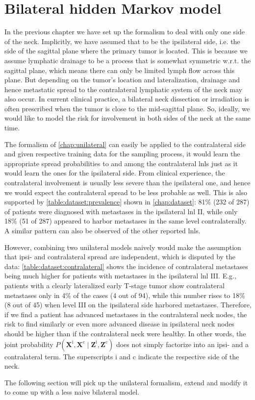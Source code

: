 \documentclass[\relativeRoot/main.tex]{subfiles}
\begin{document}
\chapter{Bilateral hidden Markov model}
\label{chap:bilateral}

In the previous chapter we have set up the formalism to deal with only one side of the neck. Implicitly, we have assumed that to be the ipsilateral side, i.e. the side of the sagittal plane where the primary tumor is located. This is because we assume lymphatic drainage to be a process that is somewhat symmetric w.r.t. the sagittal plane, which means there can only be limited lymph flow across this plane. But depending on the tumor's location and lateralization, drainage and hence metastatic spread to the contralateral lymphatic system of the neck may also occur. In current clinical practice, a bilateral neck dissection or irradiation is often prescribed when the tumor is close to the mid-sagittal plane. So, ideally, we would like to model the risk for involvement in both sides of the neck at the same time.

The formalism of \cref{chap:unilateral} can easily be applied to the contralateral side and given respective training data for the sampling process, it would learn the appropriate spread probabilities to and among the contralateral \glspl{lnl} just as it would learn the ones for the ipsilateral side. From clinical experience, the contralateral involvement is usually less severe than the ipsilateral one, and hence we would expect the contralateral spread to be less probable as well. This is also supported by \cref{table:dataset:prevalence} shown in \cref{chap:dataset}: 81\% (232 of 287) of patients were diagnosed with metastases in the ipsilateral \gls{lnl} II, while only 18\% (51 of 287) appeared to harbor metastases in the same level contralaterally. A similar pattern can also be observed of the other reported \glspl{lnl}.

However, combining two unilateral models naively would make the assumption that ipsi- and contralateral spread are independent, which is disputed by the data: \cref{table:dataset:contralateral} shows the incidence of contralateral metastases being much higher for patients with metastases in the ipsilateral \gls{lnl} III. E.g., patients with a clearly lateralized early T-stage tumor show contralateral metastases only in 4\% of the cases (4 out of 94), while this number rises to 18\% (8 out of 45) when level III on the ipsilateral side harbored metastases. Therefore, if we find a patient has advanced metastases in the contralateral neck nodes, the risk to find similarly or even more advanced disease in ipsilateral neck nodes should be higher than if the contralateral neck were healthy. In other words, the joint probability $P \left( \mathbf{X}^\text{i}, \mathbf{X}^\text{c} \mid \mathbf{Z}^\text{i}, \mathbf{Z}^\text{c} \right)$ does not simply factorize into an ipsi- and a contralateral term. The superscripts $\text{i}$ and $\text{c}$ indicate the respective side of the neck.

The following section will pick up the unilateral formalism, extend and modify it to come up with a less naive bilateral model.




\end{document}
